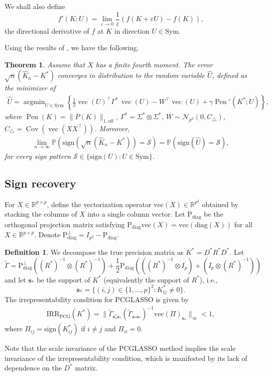 \documentclass[12pt]{amsart}
\numberwithin{equation}{section}
\numberwithin{equation}{section}
\theoremstyle{plain}
\newtheorem{thm}{Theorem}
\theoremstyle{definition}
\newtheorem{defin}{Definition}
\DeclareMathOperator*{\argmin}{\arg\min}
\newcommand{\diag}[1]{\mathrm{diag}(#1)}
\newcommand{\R}{\mathbb{R}}
\newcommand{\Sym}{\mathrm{Sym}}
\newcommand{\sign}{\mathrm{sign}}
\newcommand{\Supp}{\mathbf{s}_\ast}
\renewcommand{\v}[1]{\mathrm{vec}(#1)}
\begin{document}
We shall also define
\[
f'(K;U)=\lim_{\varepsilon\to 0}\frac{1}{\varepsilon}\left(f(K+\varepsilon U)-f(K)\right),
\]
the directional derivative of $f$ at $K$ in direction $U\in\Sym$. 

Using the results of \cite{hejny2025asymptotic}, we have the following.
\begin{thm}\label{thm:conv_in_dist}
Assume that $X$ has a finite fourth moment. The error $\sqrt{n}(\hat{K}_n-K^\ast)$ converges in distribution to the random variable $\hat{U}$, defined as the minimizer of
\begin{align}\label{vec(U) objective}
\hat{U}=\argmin_{U\in\Sym}\left\{ \frac{1}{2}\operatorname{vec}(U)^\top \Gamma^\ast\, \operatorname{vec}(U) - W^\top \operatorname{vec}(U) + \gamma \operatorname{Pen}'(K^\ast; U)\right\},
\end{align}
where $\operatorname{Pen}(K) = \| P(K)\|_{1,\mathrm{off}}$, $\Gamma^\ast=\Sigma^\ast\otimes\Sigma^\ast$, $W\sim\mathcal{N}_{p^2}(0,C_{\triangle})$, $C_{\triangle}= \operatorname{Cov}( \operatorname{vec}(XX^\top))$.  Moreover, \begin{align*}
\lim_{n\to\infty}\mathbb{P}\left(\sign(\sqrt{n}(\hat{K}_n-K^\ast))=\mathcal{S}\right)=\mathbb{P}\left(\sign(\hat{U})=\mathcal{S}\right),
\end{align*}
for every sign pattern $\mathcal{S}\in\{\sign(U)\colon U\in \Sym\}$.
\end{thm}


\subsection{Sign recovery}\label{sec:recovery}
For $X\in \R^{p\times p}$, define the vectorization operator $\v{X}\in\R^{p^2}$ obtained by stacking the columns of $X$ into a single column vector. Let $\mathrm{P}_{\mathrm{diag}}$ be the orthogonal projection matrix satisfying $\mathrm{P}_{\mathrm{diag}} \v{X}=\v{\diag{X}}$ for all $X\in\R^{p\times p}$. Denote $\mathrm{P}_{\mathrm{diag}}^\bot = I_{p^2}-\mathrm{P}_{\mathrm{diag}}$. 

\begin{defin}
We decompose the true precision matrix as 
$K^\ast=D^\ast R^\ast D^\ast$.
Let
  \[
    \tilde{\Gamma}=\mathrm{P}_{\mathrm{diag}}^\bot((R^\ast)^{-1}\otimes(R^\ast)^{-1})+\frac12\mathrm{P}_{\mathrm{diag}}(((R^\ast)^{-1}\otimes I_p)+(I_p\otimes (R^\ast)^{-1}))
\]
and let $\Supp$ be the support of $K^\ast$ (equivalently the support of $R^\ast$), i.e., 
\[
\Supp = \{ (i,j)\in \{1,\ldots,p\}^2\colon K^\ast_{ij}\neq 0\}.
\]
    The irrepresentability condition for PCGLASSO is given by
\begin{align}\label{new irrepresentability condition}
  \mathrm{IRR}_{\mathrm{PCG}}(K^\ast) = \| \tilde{\Gamma}_{\Supp^c\Supp} (\tilde{\Gamma}_{\Supp\Supp})^{-1}\v{\Pi}_{\Supp}\|_{\infty}<1,
\end{align}
where $\Pi_{ij} = \sign(K^\ast_{ij})$ if $i\neq j$ and $\Pi_{ii}=0$. 
\end{defin}
Note that the scale invariance of the PCGLASSO method implies the scale invariance of the irrepresentability condition, which is manifested by its lack of dependence on the $D^\ast$ matrix.
\end{document}
